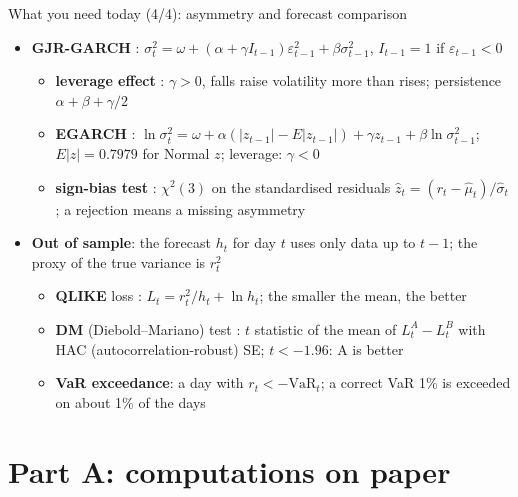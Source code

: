 \begin{frame}{What you need today (4/4): asymmetry and forecast comparison}
\itemsize{\small}
\begin{itemize}
    \item \textbf{GJR-GARCH} : $\sigma_t^2 = \omega + (\alpha + \gamma I_{t-1})\varepsilon_{t-1}^2 + \beta\sigma_{t-1}^2$, $I_{t-1} = 1$ if $\varepsilon_{t-1} < 0$
    \begin{itemize}
        \item \textbf{leverage effect} : $\gamma > 0$, falls raise volatility more than rises; persistence $\alpha + \beta + \gamma/2$
        \item \textbf{EGARCH} : $\ln\sigma_t^2 = \omega + \alpha(|z_{t-1}| - E|z_{t-1}|) + \gamma z_{t-1} + \beta\ln\sigma_{t-1}^2$; $E|z| = 0.7979$ for Normal $z$; leverage: $\gamma < 0$
        \item \textbf{sign-bias test} : $\chi^2(3)$ on the standardised residuals $\hat z_t = (r_t - \hat\mu_t)/\hat\sigma_t$; a rejection means a missing asymmetry
    \end{itemize}
    \item \textbf{Out of sample}: the forecast $h_t$ for day $t$ uses only data up to $t-1$; the proxy of the true variance is $r_t^2$
    \begin{itemize}
        \item \textbf{QLIKE} loss : $L_t = r_t^2/h_t + \ln h_t$; the smaller the mean, the better
        \item \textbf{DM} (Diebold--Mariano) test : $t$ statistic of the mean of $L_t^A - L_t^B$ with HAC (autocorrelation-robust) SE; $t < -1.96$: A is better
        \item \textbf{VaR exceedance}: a day with $r_t < -\mathrm{VaR}_t$; a correct VaR 1\% is exceeded on about 1\% of the days
    \end{itemize}
\end{itemize}
\end{frame}


\section{Part A: computations on paper}

